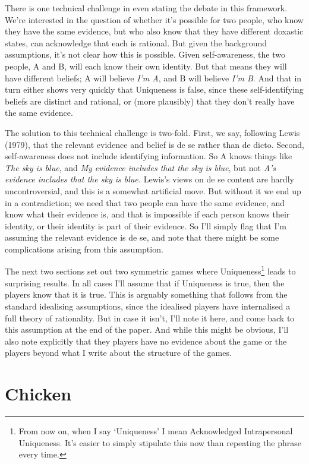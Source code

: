 \documentclass[
  11pt,
]{article}
\begin{document}
There is one technical challenge in even stating the debate in this framework. We're interested in the question of whether it's possible for two people, who know they have the same evidence, but who also know that they have different doxastic states, can acknowledge that each is rational. But given the background assumptions, it's not clear how this is possible. Given self-awareness, the two people, A and B, will each know their own identity. But that means they will have different beliefs; A will believe \emph{I'm A}, and B will believe \emph{I'm B}. And that in turn either shows very quickly that Uniqueness is false, since these self-identifying beliefs are distinct and rational, or (more plausibly) that they don't really have the same evidence.

The solution to this technical challenge is two-fold. First, we say, following Lewis (1979), that the relevant evidence and belief is de se rather than de dicto. Second, self-awareness does not include identifying information. So A knows things like \emph{The sky is blue}, and \emph{My evidence includes that the sky is blue}, but not \emph{A's evidence includes that the sky is blue.} Lewis's views on de se content are hardly uncontroversial, and this is a somewhat artificial move. But without it we end up in a contradiction; we need that two people can have the same evidence, and know what their evidence is, and that is impossible if each person knows their identity, or their identity is part of their evidence. So I'll simply flag that I'm assuming the relevant evidence is de se, and note that there might be some complications arising from this assumption.

The next two sections set out two symmetric games where Uniqueness\footnote{From now on, when I say `Uniqueness' I mean Acknowledged Intrapersonal Uniqueness. It's easier to simply stipulate this now than repeating the phrase every time.} leads to surprising results. In all cases I'll assume that if Uniqueness is true, then the players know that it is true. This is arguably something that follows from the standard idealising assumptions, since the idealised players have internalised a full theory of rationality. But in case it isn't, I'll note it here, and come back to this assumption at the end of the paper. And while this might be obvious, I'll also note explicitly that they players have no evidence about the game or the players beyond what I write about the structure of the games.

\section{Chicken}\label{chicken}
\end{document}
